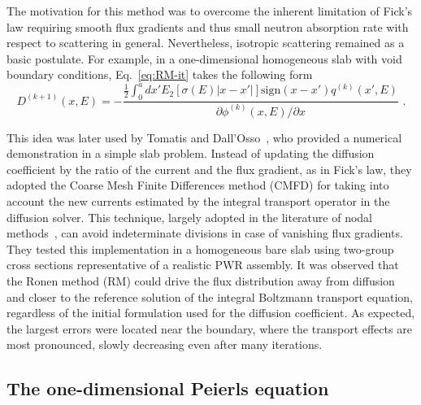 The motivation for this method was to overcome the inherent limitation of Fick's law requiring smooth flux gradients and thus small neutron absorption rate with respect to scattering in general. Nevertheless, isotropic scattering remained as a basic postulate.
For example, in a one-dimensional homogeneous slab with void boundary conditions, Eq.~\eqref{eq:RM-it} takes the following form~\cite{Ronen-2004} 
\begin{equation}\label{eq:RM-it-1D-slab}
D^{(k+1)}(x,E) = -\frac{\frac{1}{2}\int_0^a dx' E_2[\sigma(E)\lvert
	x-x'\rvert]\text{sign}(x-x')q^{(k)}(x',E)}
{\partial \phi^{(k)}(x,E)/\partial x} \,\, .
\end{equation}

This idea was later used by Tomatis and Dall'Osso~\cite{Tomatis-2011}, who provided a numerical demonstration in a simple slab problem. Instead of updating the diffusion coefficient by the ratio of the current and the flux gradient, as in Fick's law, they adopted the Coarse Mesh Finite Differences method (CMFD) for taking into account the new currents estimated by the integral transport operator in the diffusion solver. 
%
%
This technique, largely adopted in the literature of nodal methods~\cite{Smith-1983,Lawrence-1986}, can avoid indeterminate divisions in case of vanishing flux gradients. They tested this implementation in a homogeneous bare slab using two-group cross sections representative of a realistic PWR assembly. It was observed that the Ronen method (RM) could drive the flux distribution away from diffusion and closer to the reference solution of the integral Boltzmann transport equation, regardless of the initial formulation used for the diffusion coefficient. As expected, the largest errors were located near the boundary, where the transport effects are most pronounced, slowly decreasing even after many iterations.%

%
\subsection{The one-dimensional Peierls equation}
\label{sec:Peierls}

